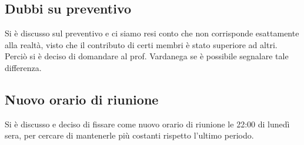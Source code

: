 \subsection{Dubbi su preventivo}
Si è discusso sul preventivo e ci siamo resi conto che non corrisponde esattamente alla realtà, visto che il contributo di certi membri è stato superiore ad altri. Perciò si è deciso di domandare al prof. Vardanega se è possibile segnalare tale differenza.

\subsection{Nuovo orario di riunione}
Si è discusso e deciso di fissare come nuovo orario di riunione le 22:00 di lunedì sera, per cercare di mantenerle più costanti rispetto l'ultimo periodo.
